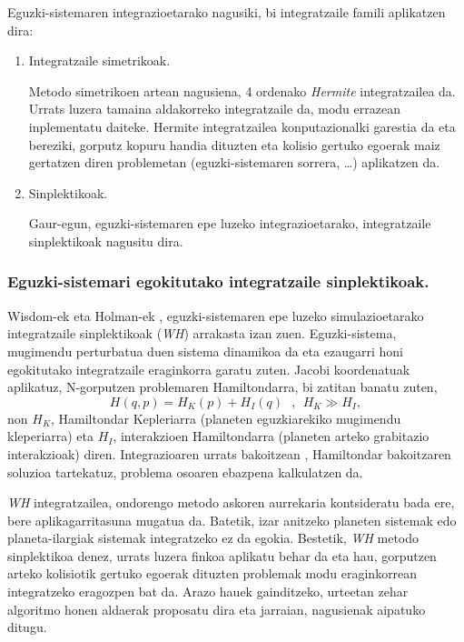 Eguzki-sistemaren integrazioetarako nagusiki, bi integratzaile famili aplikatzen dira: 
\begin{enumerate}
\item Integratzaile simetrikoak.

Metodo simetrikoen artean nagusiena, 4 ordenako \emph{Hermite} \cite{Aarseth2008} integratzailea da.
Urrats luzera tamaina aldakorreko integratzaile da, modu errazean inplementatu daiteke.  Hermite integratzailea konputazionalki garestia da eta bereziki, gorputz kopuru handia dituzten eta kolisio gertuko egoerak maiz gertatzen diren problemetan (eguzki-sistemaren sorrera, \dots) aplikatzen da.  

\item Sinplektikoak.

Gaur-egun, eguzki-sistemaren epe luzeko integrazioetarako, integratzaile sinplektikoak nagusitu dira. 

\end{enumerate}


\subsubsection*{Eguzki-sistemari egokitutako integratzaile sinplektikoak.}

Wisdom-ek eta Holman-ek \cite[1991]{Sussman1992}, eguzki-sistemaren epe luzeko simulazioetarako integratzaile  sinplektikoak (\emph{WH}) arrakasta izan zuen. Eguzki-sistema, mugimendu perturbatua duen sistema dinamikoa da eta ezaugarri honi egokitutako integratzaile eraginkorra garatu zuten. Jacobi koordenatuak  aplikatuz, N-gorputzen problemaren Hamiltondarra, bi zatitan banatu zuten,
\begin{equation*}
H(q,p)=H_K(p)+H_I(q) \ \ \ , \ \ H_K\gg H_I,
\end{equation*}
non $H_K$, Hamiltondar Kepleriarra (planeten eguzkiarekiko mugimendu kleperiarra) eta $H_I$, interakzioen Hamiltondarra (planeten arteko grabitazio interakzioak) diren. Integrazioaren urrats bakoitzean , Hamiltondar bakoitzaren soluzioa tartekatuz, problema osoaren ebazpena kalkulatzen da.  

\emph{WH} integratzailea, ondorengo metodo askoren aurrekaria kontsideratu bada ere, bere aplikagarritasuna mugatua da. Batetik, izar anitzeko planeten sistemak edo planeta-ilargiak sistemak integratzeko ez da egokia. Bestetik, \emph{WH} metodo sinplektikoa denez, urrats luzera finkoa aplikatu behar da eta hau, gorputzen arteko kolisiotik gertuko egoerak dituzten problemak modu eraginkorrean integratzeko eragozpen bat da. Arazo hauek gainditzeko, urteetan zehar algoritmo honen aldaerak proposatu dira eta jarraian, nagusienak aipatuko ditugu. 

